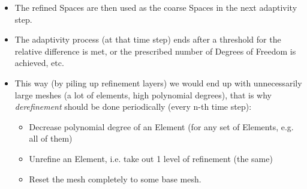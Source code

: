 \documentclass{beamer}
\begin{document}
\begin{frame}
\begin{center}
\begin{figure}[t]
\end{figure}
\end{center}
\begin{itemize}
\item
The refined Spaces are then used as the coarse Spaces in the next adaptivity step.
\item
The adaptivity process (at that time step) ends after a threshold for the relative difference is met, or the prescribed number of Degrees of Freedom is achieved, etc.
\item
This way (by piling up refinement layers) we would end up with unnecessarily large meshes (a lot of elements, high polynomial degrees), that is why \emph{derefinement} should be done periodically (every n-th time step):
	\begin{itemize}
	\item Decrease polynomial degree of an Element (for any set of Elements, e.g. all of them)
	\item Unrefine an Element, i.e. take out 1 level of refinement (the same)
	\item Reset the mesh completely to some base mesh.
	\end{itemize}
\end{itemize}
\end{frame}
\end{document}
